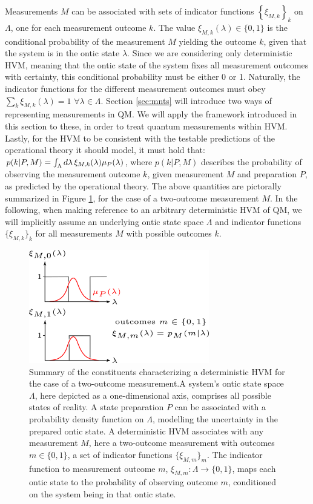 Measurements $M$ can be associated with sets of indicator functions $\left\{ \xi_{M,k}\right\} _{k}$ on $\Lambda$, one for each measurement outcome $k$. The value $\xi_{M,k}(\lambda)\in\{0,1\}$ is the conditional probability of the measurement $M$ yielding the outcome $k$, given that the system is in the ontic state $\lambda$. Since we are considering only deterministic HVM, meaning that the ontic state of the system fixes all measurement outcomes with certainty, this conditional probability must be either 0 or 1. Naturally, the indicator functions for the different measurement outcomes must obey $\sum_{k}\xi_{M,k}(\lambda)=1$ $\forall\lambda\in\Lambda$. Section \ref{sec:mnts} will introduce two ways of representing measurements in QM. We will apply the framework introduced in this section to these, in order to treat quantum measurements within HVM. Lastly, for the HVM to be consistent with the testable predictions of the operational theory it should model, it must hold that: $p(k\vert P,M)=\int_{\Lambda}d\lambda\thinspace\xi_{M,k}(\lambda)\mu_{P}(\lambda)$, where $p(k\vert P,M)$ describes the probability of observing the measurement outcome $k$, given measurement $M$ and preparation $P$, as predicted by the operational theory. The above quantities are pictorally summarized in Figure \ref{fig:hvm}, for the case of a two-outcome measurement $M$. In the following, when making reference to an arbitrary deterministic HVM of QM, we will implicitly assume an underlying ontic state space $\Lambda$ and indicator functions $\{\xi_{M,k}\}_{k}$ for all measurements $M$ with possible outcomes $k$.

\begin{figure}
    \centering
    \includegraphics[width=0.7\textwidth]{images/hvm.png}
    \caption{Summary of the constituents characterizing a deterministic HVM for the case of a two-outcome measurement.\hfill\break A system's ontic state space $\Lambda$, here depicted as a one-dimensional axis, comprises all possible states of reality. A state preparation $P$ can be associated with a probability density function on $\Lambda$, modelling the uncertainty in the prepared ontic state. A deterministic HVM associates with any measurement $M$, here a two-outcome measurement with outcomes $m\in\{0,1\}$, a set of indicator functions $\{\xi_{M,m}\}_m$. The indicator function to measurement outcome $m$, $\xi_{M,m}:\Lambda\rightarrow\{0,1\}$, maps each ontic state to the probability of observing outcome $m$, conditioned on the system being in that ontic state.}
    \label{fig:hvm}
\end{figure}

